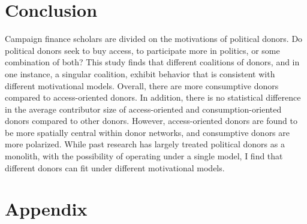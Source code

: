 \documentclass[12pt,]{article}
\begin{document}
\hypertarget{conclusion}{%
\section{Conclusion}\label{conclusion}}

Campaign finance scholars are divided on the motivations of political
donors. Do political donors seek to buy access, to participate more in
politics, or some combination of both? This study finds that different
coalitions of donors, and in one instance, a singular coalition, exhibit
behavior that is consistent with different motivational models. Overall,
there are more consumptive donors compared to access-oriented donors. In
addition, there is no statistical difference in the average contributor
size of access-oriented and consumption-oriented donors compared to
other donors. However, access-oriented donors are found to be more
spatially central within donor networks, and consumptive donors are more
polarized. While past research has largely treated political donors as a
monolith, with the possibility of operating under a single model, I find
that different donors can fit under different motivational models.

\newpage

\hypertarget{appendix}{%
\section{Appendix}\label{appendix}}
\end{document}
